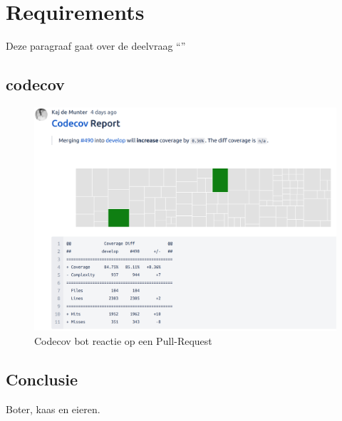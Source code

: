 \chapter{Requirements}

\label{Chapter7}

Deze paragraaf gaat over de deelvraag \enquote{\deelrequirements}

\section{codecov}
\begin{figure}[h]
	\centering
	\includegraphics[width=13cm]{Figures/coverage}
	\decoRule
	\caption[Codecov bot]{Codecov bot reactie op een Pull-Request}
	\label{fig:coverage}
\end{figure}

\section{Conclusie}

Boter, kaas en eieren.